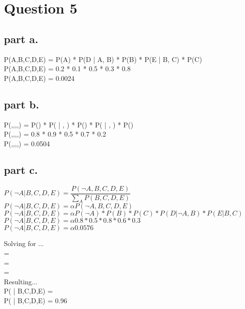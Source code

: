 \section{Question 5}

\subsection{part a.}
P(A,B,C,D,E) = P(A) * P(D | A, B) * P(B) * P(E | B, C) * P(C) \\
P(A,B,C,D,E) = 0.2 * 0.1 * 0.5 * 0.3 * 0.8 \\
P(A,B,C,D,E) = 0.0024

\subsection{part b.}

P(,,,,) = P() * P( | , ) * P() * P( | , ) * P() \\
P(,,,,) = 0.8 * 0.9 * 0.5 * 0.7 * 0.2 \\
P(,,,,) = 0.0504

\subsection{part c.}


$ P(\neg{A} | B,C,D,E) = \dfrac{P(\neg{A}, B, C, D, E)}{\sum\limits_{A}^{} P(B, C, D, E)} $ \\
$ P(\neg{A} | B,C,D,E) = \alpha P(\neg{A}, B, C, D, E) $ \\
$ P(\neg{A} | B,C,D,E) = \alpha P(\neg{A}) * P(B) * P(C) * P(D | \neg{A}, B) * P(E | B, C) $ \\
$ P(\neg{A} | B,C,D,E) = \alpha 0.8 * 0.5 * 0.8 * 0.6 * 0.3 $ \\
$ P(\neg{A} | B,C,D,E) = \alpha 0.0576 $ 

\newpage
Solving for \alpha ... \\
\alpha =  \\
\alpha =  \\
\alpha =  \\

Resulting...\\
P( | B,C,D,E) =   \\
P( | B,C,D,E) = 0.96
